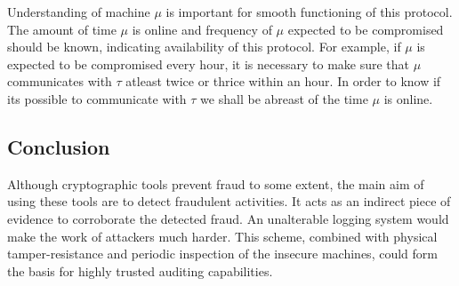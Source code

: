 \documentclass[12pt, letter]{article}
\begin{document}
Understanding of machine $\mu$ is important for smooth functioning of this protocol. The amount of time $\mu$ is online and frequency of $\mu$ expected to be compromised should be known, indicating availability of this protocol. For example, if $\mu$ is expected to be compromised every hour, it is necessary to make sure that $\mu$ communicates with $\tau$ atleast twice or thrice within an hour. In order to know if its possible to communicate with $\tau$ we shall be abreast of the time $\mu$ is online.

\subsection{Conclusion}

Although cryptographic tools prevent fraud to some extent, the main aim of using these tools are to detect fraudulent activities. It acts as an indirect piece of evidence to corroborate the detected fraud. An unalterable logging system would make the work of attackers much harder. This scheme, combined with physical tamper-resistance and periodic inspection of the insecure machines, could form the basis for highly trusted auditing capabilities. 
\end{document}
